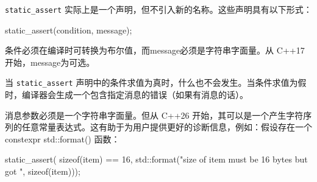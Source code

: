 \verb|static_assert| 实际上是一个声明，但不引入新的名称。这些声明具有以下形式：

\begin{cpp}
static_assert(condition, message);
\end{cpp}

条件必须在编译时可转换为布尔值，而message必须是字符串字面量。从 C++17 开始，message为可选。

当 \verb|static_assert| 声明中的条件求值为真时，什么也不会发生。当条件求值为假时，编译器会生成一个包含指定消息的错误（如果有消息的话）。

消息参数必须是一个字符串字面量。但从 C++26 开始，其可以是一个产生字符序列的任意常量表达式。这有助于为用户提供更好的诊断信息，例如：假设存在一个 constexpr std::format() 函数：

\begin{cpp}
static_assert(
    sizeof(item) == 16,
    std::format("size of item must be 16 bytes but got {}", sizeof(item)));
\end{cpp}





